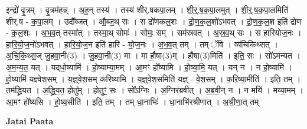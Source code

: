 \documentclass[17pt]{extarticle}
\begin{document}
इन्द्रो॑ वृ॒त्रम् । वृ॒त्रम॑हन्न् । अ॒ह॒न् तस्य॑ । तस्य॑ शीर्.षकपा॒लम् । शी॒र्॒.ष॒क॒पा॒लमुत् । शी॒र्॒.ष॒क॒पा॒लमिति॑ शीर्.ष - क॒पा॒लम् । उदौ᳚ब्जत् । औ॒ब्ज॒थ् सः । स द्रो॑णकल॒शः । द्रो॒ण॒क॒ल॒शो॑ऽभवत् । द्रो॒ण॒क॒ल॒श इति॑ द्रोण - क॒ल॒शः । अ॒भ॒व॒त् तस्मा᳚त् । तस्मा॒थ् सोमः॑ । सोमः॒ सम् । सम॑स्रवत् । अ॒स्र॒व॒थ् सः । स हा॑रियोज॒नः । हा॒रि॒यो॒ज॒नो॑ऽभवत् । हा॒रि॒यो॒ज॒न इति॑ हारि - यो॒ज॒नः । अ॒भ॒व॒त् तम् । तम् ॅवि । व्य॑चिकिथ्सत् । अ॒चि॒कि॒थ्स॒ज् जु॒हवा॒नी(3) । जु॒हवा॒नी(3) मा । मा हौ॒षा(3)म् । हौ॒षा(3)मिति॑ । इति॒ सः । सो॑ऽमन्यत । अ॒म॒न्य॒त॒ यत् । यद्‌धो॒ष्यामि॑ । हो॒ष्याम्या॒मम् । आ॒मꣳ हो᳚ष्यामि । हो॒ष्या॒मि॒ यत् । यन् न । न हो॒ष्यामि॑ । हो॒ष्यामि॑ यज्ञ्वेश॒सम् । य॒ज्ञ्॒वे॒श॒सम् क॑रिष्यामि । य॒ज्ञ्॒वे॒श॒समिति॑ यज्ञ् - वे॒श॒सम् । क॒रि॒ष्या॒मीति॑ । इति॒ तम् । तम॑द्ध्रियत । अ॒द्ध्रि॒य॒त॒ होतु᳚म् । होतुꣳ॒॒ सः । सो᳚ऽग्निः । अ॒ग्निर॑ब्रवीत् । अ॒ब्र॒वी॒न् न । न मयि॑ । मय्या॒मम् । आ॒मꣳ हो᳚ष्यसि । हो॒ष्य॒सीति॑ । इति॒ तम् । तम् धा॒नाभिः॑ । धा॒नाभि॑रश्रीणात् । अ॒श्री॒णा॒त् तम् \newline

\textbf{Jatai Paata} \newline
\end{document}
